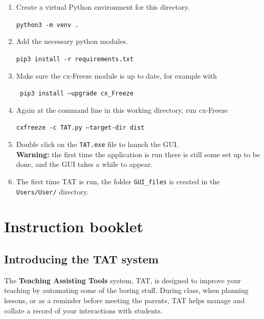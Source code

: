 \documentclass[10pt]{article}
\begin{document}
\begin{enumerate}
\item Create a virtual Python environment for this directory.

\texttt{python3 -m venv .}


\item Add the necessary python modules.

\texttt{pip3 install -r requirements.txt}

\item Make sure the cx-Freeze module is up to date, for example with

\texttt{ pip3 install --upgrade cx\_Freeze}

\item Again at the command line in this working directory, run cx-Freeze

\texttt{cxfreeze -c TAT.py --target-dir dist}

\item Double click on the \texttt{TAT.exe} file to launch the GUI. \\
\textbf{Warning:} the first time the application is run there is still some set up to be done, and the GUI takes a while to appear.

\item The first time TAT is run, the folder \texttt{GUI\_files} is created in the \texttt{Users/User/} directory.

\end{enumerate}

\newpage
\section{Instruction booklet} \label{instructions} 

\subsection{Introducing the TAT system}
The \textbf{Teaching Assisting Tools} system, TAT, is designed to improve your teaching by automating some of the boring stuff. During class, when planning lessons, or as a reminder before meeting the parents, TAT helps manage and collate a record of your interactions with students.
\end{document}
